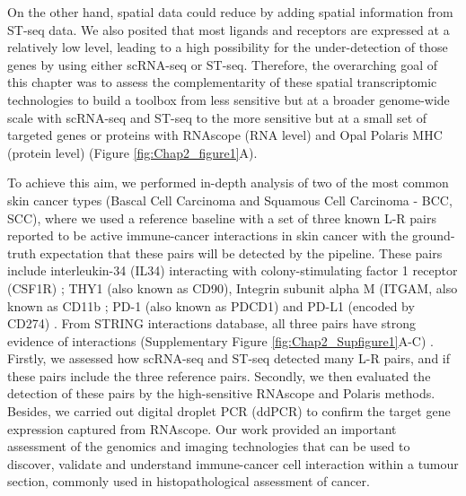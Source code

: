 On the other hand, spatial data could reduce by adding spatial information from ST-seq data. We also posited that most ligands and receptors are expressed at a relatively low level, leading to a high possibility for the under-detection of those genes by using either scRNA-seq or ST-seq. Therefore, the overarching goal of this chapter was to assess the complementarity of these spatial transcriptomic technologies to build a toolbox from less sensitive but at a broader genome-wide scale with scRNA-seq and ST-seq to the more sensitive but at a small set of targeted genes or proteins with RNAscope (RNA level) and Opal Polaris MHC (protein level) (Figure \ref{fig:Chap2_figure1}A). 

To achieve this aim, we performed in-depth analysis of two of the most common skin cancer types (Bascal Cell Carcinoma and Squamous Cell Carcinoma - BCC, SCC), where we used a reference baseline with a set of three known L-R pairs reported to be active immune-cancer interactions in skin cancer with the ground-truth expectation that these pairs will be detected by the pipeline. These pairs include interleukin-34 (IL34) interacting with colony-stimulating factor 1 receptor (CSF1R) \cite{lin2008discovery};  THY1 (also known as CD90), Integrin subunit alpha M (ITGAM, also known as CD11b \cite{wetzel2004human}; PD-1 (also known as PDCD1) and PD-L1 (encoded by CD274) \cite{pardoll2012blockade}. From STRING interactions database, all three pairs have strong evidence of interactions (Supplementary Figure \ref{fig:Chap2_Supfigure1}A-C) \cite{jensen2009string}. Firstly, we assessed how scRNA-seq and ST-seq detected many L-R pairs, and if these pairs include the three reference pairs. Secondly, we then evaluated the detection of these pairs by the high-sensitive RNAscope and Polaris methods. Besides, we carried out digital droplet PCR (ddPCR) to confirm the target gene expression captured from RNAscope. Our work provided an important assessment of the genomics and imaging technologies that can be used to discover, validate and understand immune-cancer cell interaction within a tumour section, commonly used in histopathological assessment of cancer. 

